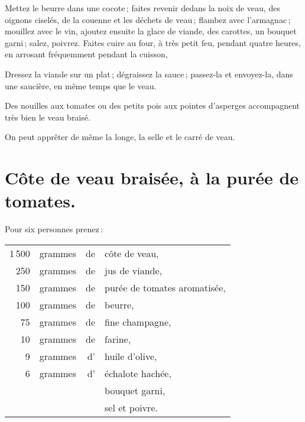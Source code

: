 Mettez le beurre dans une cocote ; faites revenir dedans la noix de veau, des
oignons ciselés, de la couenne et les déchets de veau ; flambez avec
l'armagnac ; mouillez avec le vin, ajoutez ensuite la glace de viande, des
carottes, un bouquet garni ; salez, poivrez. Faites cuire au four, à très petit
feu, pendant quatre heures, en arrosant fréquemment pendant la cuisson,

Dressez la viande sur un plat ; dégraissez la sauce ; passez-la et envoyez-la,
dans une saucière, en même temps que le veau.

Des nouilles aux tomates ou des petits pois aux pointes d'asperges accompagnent
très bien le veau braisé.

\sk

On peut apprêter de même la longe, la selle et le carré de veau.

\section*{\centering Côte de veau braisée, à la purée de tomates.}
{}

Pour six personnes prenez :

\medskip

\footnotesize
\begin{longtable}{rrrp{16em}}
  1 500 & grammes & de & côte de veau,                                                                    \\
    250 & grammes & de & jus de viande,                                                                   \\
    150 & grammes & de & purée de tomates aromatisée,                                                     \\
    100 & grammes & de & beurre,                                                                          \\
     75 & grammes & de & fine champagne,                                                                  \\
     10 & grammes & de & farine,                                                                          \\
      9 & grammes & d' & huile d'olive,                                                                   \\
      6 & grammes & d’ & échalote hachée,                                                                 \\
        &         &    & bouquet garni,                                                                   \\
        &         &    & sel et poivre.                                                                   \\
\end{longtable}
\normalsize

